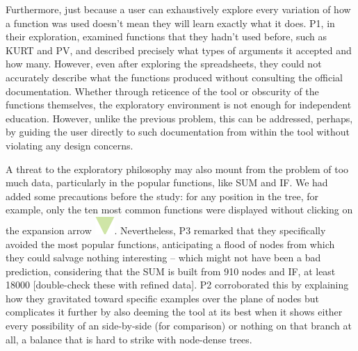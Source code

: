 \documentclass[conference]{IEEEtran}
\begin{document}
	Furthermore, just because a user can exhaustively explore every variation of
	how a function was used doesn't mean they will learn exactly what it does. P1,
	in their exploration, examined functions that they hadn't used before, such as
	KURT and PV, and described precisely what types of arguments it accepted and
	how many. However, even after exploring the spreadsheets, they could not
	accurately describe what the functions produced without consulting the official
	documentation. Whether through reticence of the tool or obscurity of the
	functions themselves, the exploratory environment is not enough for independent
	education. However, unlike the previous problem, this can be addressed,
	perhaps, by guiding the user directly to such documentation from within the
	tool without violating any design concerns. \par
	
	A threat to the exploratory philosophy may also mount from the problem of too
	much data, particularly in the popular functions, like SUM and IF. We had added
	some precautions before the study: for any position in the tree, for example,
	only the ten most common functions were displayed without clicking on the
	expansion arrow \includegraphics[scale=.35]{arrow}. Nevertheless, P3 remarked
	that they specifically avoided the most popular functions, anticipating a flood
	of nodes from which they could salvage nothing interesting -- which might not
	have been a bad prediction, considering that the SUM is built from 910 nodes
	and IF, at least 18000 [double-check these with refined data]. P2 corroborated
	this by explaining how they gravitated toward specific examples over the plane
	of nodes but complicates it further by also deeming the tool at its best when
	it shows either every possibility of an side-by-side (for comparison) or
	nothing on that branch at all, a balance that is hard to strike with node-dense
	trees. \par
	
\end{document}
